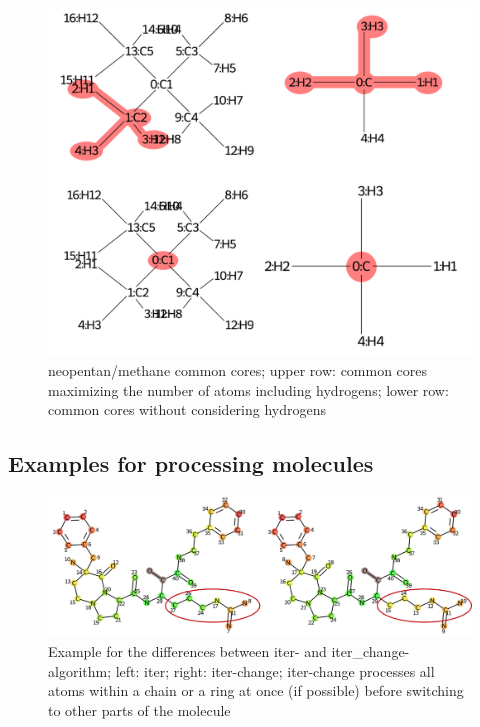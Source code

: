 \begin{figure}
	\includegraphics[scale=1.0]{neopentan}
	
	\caption{neopentan/methane common cores; upper row: common cores maximizing the number of atoms including hydrogens; lower row: common cores without considering hydrogens}
		\label{fig:neopentan}
\end{figure}



\subsection{Examples for processing molecules}

\begin{figure}
\includegraphics[scale=0.5]{iter_iter_change_1a5g_1}

\caption{Example for the differences between iter- and iter\_change-algorithm;
left: iter; right: iter-change; iter-change processes all atoms within
a chain or a ring at once (if possible) before switching to other
parts of the molecule}
\end{figure}

